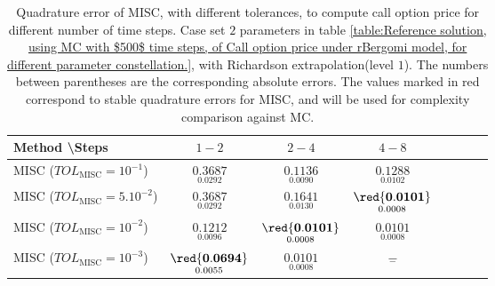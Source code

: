\begin{table}[h!]
	\centering
	\begin{tabular}{l*{6}{c}r}
		Method \textbackslash  Steps            & $1-2$ & $2-4$ & $4-8$ \\
		\hline
		MISC ($TOL_{\text{MISC}}=10^{-1}$)  & $\underset{ 0.0292}{\mathbf{
				0.3687}}$ & $\underset{ 0.0090}{\mathbf{    0.1136}}$ & $\underset{  0.0102}{\mathbf{  0.1288
		}}$   \\
		MISC ($TOL_{\text{MISC}}=5.10^{-2}$)  & $\underset{ 0.0292}{\mathbf{
				0.3687}}$& $\underset{  0.0130}{\mathbf{
				0.1641
		}}$ & $\underset{0.0008}{\mathbf{\red{0.0101}}}$  \\
		MISC ($TOL_{\text{MISC}}=10^{-2}$)  & $\underset{   0.0096
		}{\mathbf{    0.1212
		}}$ & $\underset{0.0008}{\mathbf{
				\red{0.0101}}}$ & $\underset{0.0008 }{\mathbf{
				0.0101}}$  \\
		MISC ($TOL_{\text{MISC}}=10^{-3}$)  & $\underset{     0.0055
		}{\mathbf{ \red{    0.0694}
		}}$ & $\underset{0.0008}{\mathbf{
				0.0101}}$ & $\underset{-}{\mathbf{-}}$   \\
		
%		
		\hline
	\end{tabular}
	\caption{Quadrature error of MISC, with different tolerances,   to compute call option price for different number of time steps. Case set $2$ parameters in table \ref{table:Reference solution, using MC with $500$ time steps, of Call option price under rBergomi model, for different parameter constellation.}, with Richardson extrapolation(level $1$). The numbers between parentheses are the corresponding absolute errors. The values marked in red correspond to stable quadrature errors for MISC, and will be used for complexity comparison against MC.}
	\label{Quadrature error of MISC to compute Call option price of the different tolerances for different number of time steps. Case set $2$ parameters, with Richardson extrapolation(level $1$). The numbers between parentheses are the corresponding absolute errors,linear}
\end{table}



